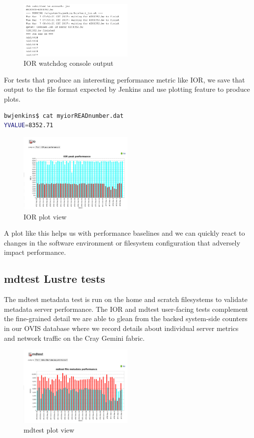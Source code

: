 \documentclass[10pt, conference, compsocconf]{IEEEtran}
\begin{document}
\begin{figure}[H]
\centering
\includegraphics[width=0.5\textwidth]{IOR-watchdog-out}
\caption{ IOR watchdog console output }
\label{fig:IOR-watchdog-out}
\end{figure}
For tests that produce an interesting performance metric like IOR, we save that output to the file format expected by Jenkins and use plotting feature to produce plots. 
\begin{lstlisting}[frame=tb,captionpos=t,language=bash,caption={sample YVALUE output file}, label=lst:yvalue]
bwjenkins$ cat myiorREADnumber.dat 
YVALUE=8352.71
\end{lstlisting}
\begin{figure}[H]
\centering
\includegraphics[width=0.5\textwidth]{IOR-plot}
\caption{ IOR plot view }
\label{fig:IOR-plot}
\end{figure}
A plot like this helps us with performance baselines and we can quickly react to changes in the software environment or filesystem configuration that adversely impact performance.

\subsection{mdtest Lustre tests}
The mdtest metadata test is run on the home and scratch filesystems to validate metadata server performance.  The IOR and mdtest user-facing tests complement the fine-grained detail we are able to glean from the backed system-side counters in our OVIS database where we record details about individual server metrics and network traffic on the Cray Gemini fabric.  
\begin{figure}[H]
\centering
\includegraphics[width=0.5\textwidth]{mdtest-plot}
\caption{ mdtest plot view }
\label{fig:mdtest-plot}
\end{figure}
\end{document}
